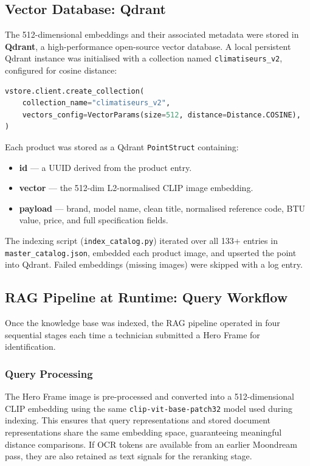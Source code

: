 \subsection{Vector Database: Qdrant}

The 512-dimensional embeddings and their associated metadata were stored in \textbf{Qdrant}, a high-performance open-source vector database. A local persistent Qdrant instance was initialised with a collection named \texttt{climatiseurs\_v2}, configured for cosine distance:

\begin{lstlisting}[language=Python, caption={Qdrant collection initialisation with 512-dimensional CLIP vectors.}]
vstore.client.create_collection(
    collection_name="climatiseurs_v2",
    vectors_config=VectorParams(size=512, distance=Distance.COSINE),
)
\end{lstlisting}

Each product was stored as a Qdrant \texttt{PointStruct} containing:
\begin{itemize}
  \item \textbf{id} — a UUID derived from the product entry.
  \item \textbf{vector} — the 512-dim L2-normalised CLIP image embedding.
  \item \textbf{payload} — brand, model name, clean title, normalised reference code, BTU value, price, and full specification fields.
\end{itemize}

The indexing script (\texttt{index\_catalog.py}) iterated over all 133+ entries in \texttt{master\_catalog.json}, embedded each product image, and upserted the point into Qdrant. Failed embeddings (missing images) were skipped with a log entry.

\subsection{RAG Pipeline at Runtime: Query Workflow}

Once the knowledge base was indexed, the RAG pipeline operated in four sequential stages each time a technician submitted a Hero Frame for identification.

\subsubsection{Query Processing}
The Hero Frame image is pre-processed and converted into a 512-dimensional CLIP embedding using the same \texttt{clip-vit-base-patch32} model used during indexing. This ensures that query representations and stored document representations share the same embedding space, guaranteeing meaningful distance comparisons. If OCR tokens are available from an earlier Moondream pass, they are also retained as text signals for the reranking stage.

